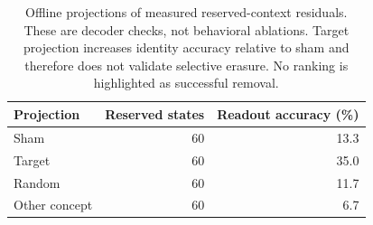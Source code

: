 \begin{table}[htbp]
\centering\small
\begin{tabular}{@{}lrr@{}}
\toprule
Projection & Reserved states & Readout accuracy (\%) \\
\midrule
Sham & 60 & 13.3 \\
Target & 60 & 35.0 \\
Random & 60 & 11.7 \\
Other concept & 60 & 6.7 \\
\bottomrule
\end{tabular}
\caption{Offline projections of measured reserved-context residuals. These are decoder checks, not behavioral ablations. Target projection increases identity accuracy relative to sham and therefore does not validate selective erasure. No ranking is highlighted as successful removal.}
\label{tab:offline}
\end{table}
